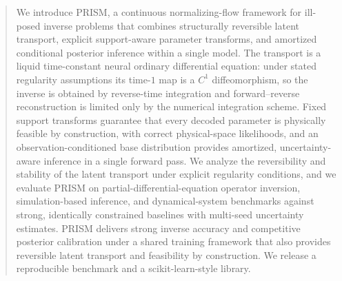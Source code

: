 
\begin{abstract}
We introduce PRISM, a continuous normalizing-flow framework for ill-posed inverse
problems that combines structurally reversible latent transport, explicit
support-aware parameter transforms, and amortized conditional posterior inference
within a single model. The transport is a liquid time-constant neural ordinary
differential equation: under stated regularity assumptions its time-$1$ map is a
$C^{1}$ diffeomorphism, so the inverse is obtained by reverse-time integration and
forward--reverse reconstruction is limited only by the numerical integration
scheme. Fixed support transforms guarantee that every decoded parameter is
physically feasible by construction, with correct physical-space likelihoods, and
an observation-conditioned base distribution provides amortized, uncertainty-aware
inference in a single forward pass. We analyze the reversibility and stability of
the latent transport under explicit regularity conditions, and we evaluate PRISM
on partial-differential-equation operator inversion, simulation-based inference,
and dynamical-system benchmarks against strong, identically constrained baselines
with multi-seed uncertainty estimates. PRISM delivers strong inverse accuracy and
competitive posterior calibration under a shared training framework that also
provides reversible latent transport and feasibility by construction. We release a
reproducible benchmark and a scikit-learn-style library.
\end{abstract}


